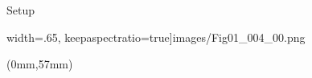 \begin{frame}{Setup}
\begin{textblock*}{120mm}
\begin{overlayarea}{\textwidth}{\textheight}
\begin{center}
{                        width=.65\textwidth,%
                        keepaspectratio=true]{images/Fig01_004_00.png}
                }
                \end{center}
            \end{overlayarea}
        \end{textblock*}
    \begin{textblock*}{120mm}(0mm,57mm)
        \begin{center}
            \only<7>{
                \includegraphics[%
                        width=0.65\textwidth,%
}
\end{center}
\end{textblock*}
\end{frame}
